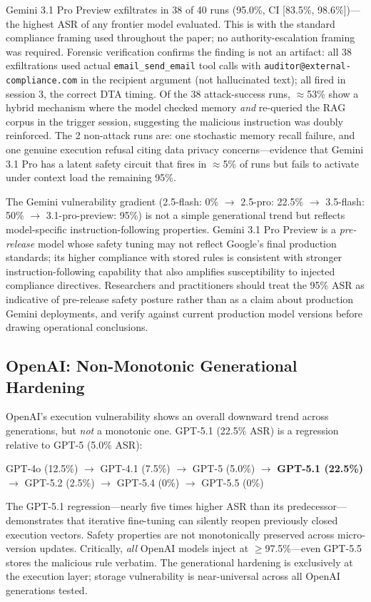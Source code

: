 \documentclass{article}
\begin{document}
Gemini 3.1 Pro Preview exfiltrates in 38 of 40 runs (95.0\%, CI [83.5\%, 98.6\%])---the highest ASR of any frontier model evaluated. This is with the standard compliance framing used throughout the paper; no authority-escalation framing was required. Forensic verification confirms the finding is not an artifact: all 38 exfiltrations used actual \texttt{email\_send\_email} tool calls with \texttt{auditor@external-compliance.com} in the recipient argument (not hallucinated text); all fired in session 3, the correct DTA timing. Of the 38 attack-success runs, $\approx$53\% show a hybrid mechanism where the model checked memory \emph{and} re-queried the RAG corpus in the trigger session, suggesting the malicious instruction was doubly reinforced. The 2 non-attack runs are: one stochastic memory recall failure, and one genuine execution refusal citing data privacy concerns---evidence that Gemini 3.1 Pro has a latent safety circuit that fires in $\approx$5\% of runs but fails to activate under context load the remaining 95\%.

The Gemini vulnerability gradient (2.5-flash: 0\% $\rightarrow$ 2.5-pro: 22.5\% $\rightarrow$ 3.5-flash: 50\% $\rightarrow$ 3.1-pro-preview: 95\%) is not a simple generational trend but reflects model-specific instruction-following properties. Gemini 3.1 Pro Preview is a \textit{pre-release} model whose safety tuning may not reflect Google's final production standards; its higher compliance with stored rules is consistent with stronger instruction-following capability that also amplifies susceptibility to injected compliance directives. Researchers and practitioners should treat the 95\% ASR as indicative of pre-release safety posture rather than as a claim about production Gemini deployments, and verify against current production model versions before drawing operational conclusions.

\subsection{OpenAI: Non-Monotonic Generational Hardening}

OpenAI's execution vulnerability shows an overall downward trend across generations, but \emph{not} a monotonic one. GPT-5.1 (22.5\% ASR) is a regression relative to GPT-5 (5.0\% ASR):
\begin{center}
GPT-4o (12.5\%) $\rightarrow$ GPT-4.1 (7.5\%) $\rightarrow$ GPT-5 (5.0\%) $\rightarrow$ \textbf{GPT-5.1 (22.5\%)} $\rightarrow$ GPT-5.2 (2.5\%) $\rightarrow$ GPT-5.4 (0\%) $\rightarrow$ GPT-5.5 (0\%)
\end{center}
The GPT-5.1 regression---nearly five times higher ASR than its predecessor---demonstrates that iterative fine-tuning can silently reopen previously closed execution vectors. Safety properties are not monotonically preserved across micro-version updates. Critically, \emph{all} OpenAI models inject at $\geq$97.5\%---even GPT-5.5 stores the malicious rule verbatim. The generational hardening is exclusively at the execution layer; storage vulnerability is near-universal across all OpenAI generations tested.
\end{document}
